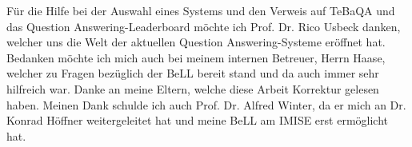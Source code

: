 Für die Hilfe bei der Auswahl eines Systems und den Verweis auf TeBaQA und das Question Answering-Leaderboard möchte ich Prof. Dr. Rico Usbeck danken, welcher uns die Welt der aktuellen Question Answering-Systeme eröffnet hat.
Bedanken möchte ich mich auch bei meinem internen Betreuer, Herrn Haase, welcher zu Fragen bezüglich der BeLL bereit stand und da auch immer sehr hilfreich war.
Danke an meine Eltern, welche diese Arbeit Korrektur gelesen haben.
Meinen Dank schulde ich auch Prof. Dr. Alfred Winter, da er mich an Dr. Konrad Höffner weitergeleitet hat und meine BeLL am IMISE erst ermöglicht hat.

\endgroup
